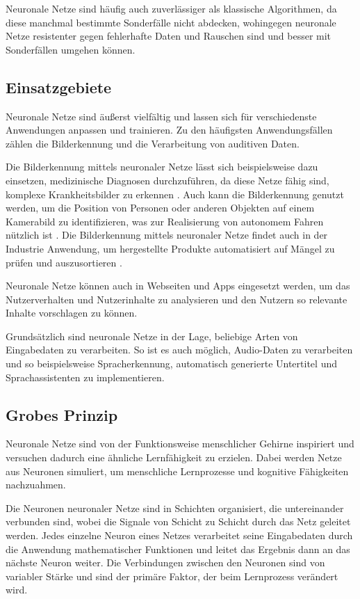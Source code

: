 \bigbreak\noindent
Neuronale Netze sind häufig auch zuverlässiger als klassische Algorithmen, da diese manchmal bestimmte Sonderfälle nicht abdecken, wohingegen neuronale Netze resistenter gegen fehlerhafte Daten und Rauschen sind und besser mit Sonderfällen umgehen können.

\subsection{Einsatzgebiete}\label{subsec:einleitung_nn:einsatzgebiete}
Neuronale Netze sind äußerst vielfältig und lassen sich für verschiedenste Anwendungen anpassen und trainieren.
Zu den häufigsten Anwendungsfällen zählen die Bilderkennung und die Verarbeitung von auditiven Daten.

\bigbreak\noindent
Die Bilderkennung mittels neuronaler Netze lässt sich beispielsweise dazu einsetzen, medizinische Diagnosen durchzuführen, da diese Netze fähig sind, komplexe Krankheitsbilder zu erkennen \cite{VTY16}.
Auch kann die Bilderkennung genutzt werden, um die Position von Personen oder anderen Objekten auf einem Kamerabild zu identifizieren, was zur Realisierung von autonomem Fahren nützlich ist \cite{BMDT16}.
Die Bilderkennung mittels neuronaler Netze findet auch in der Industrie Anwendung, um hergestellte Produkte automatisiert auf Mängel zu prüfen und auszusortieren \cite{WCQS18}.

\bigbreak\noindent
Neuronale Netze können auch in Webseiten und Apps eingesetzt werden, um das Nutzerverhalten und Nutzerinhalte zu analysieren und den Nutzern so relevante Inhalte vorschlagen zu können. \cite{YHCE18}

\bigbreak\noindent
Grundsätzlich sind neuronale Netze in der Lage, beliebige Arten von Eingabedaten zu verarbeiten.
So ist es auch möglich, Audio-Daten zu verarbeiten und so beispielsweise Spracherkennung, automatisch generierte Untertitel und Sprachassistenten zu implementieren. \cite{CJLV15}

\subsection{Grobes Prinzip}\label{subsec:einleitung_nn_grobes:prinzip}
Neuronale Netze sind von der Funktionsweise menschlicher Gehirne inspiriert und versuchen dadurch eine ähnliche Lernfähigkeit zu erzielen.
Dabei werden Netze aus Neuronen simuliert, um menschliche Lernprozesse und kognitive Fähigkeiten nachzuahmen. \cite{CA18}

\bigbreak\noindent
Die Neuronen neuronaler Netze sind in Schichten organisiert, die untereinander verbunden sind, wobei die Signale von Schicht zu Schicht durch das Netz geleitet werden.
Jedes einzelne Neuron eines Netzes verarbeitet seine Eingabedaten durch die Anwendung mathematischer Funktionen und leitet das Ergebnis dann an das nächste Neuron weiter.
Die Verbindungen zwischen den Neuronen sind von variabler Stärke und sind der primäre Faktor, der beim Lernprozess verändert wird. \cite{CA18}

